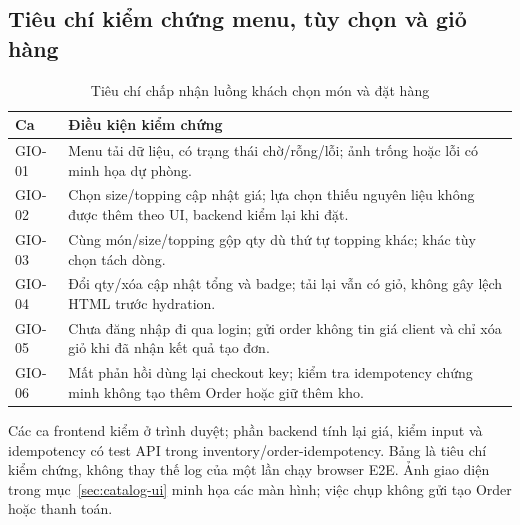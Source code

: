 \subsection{Tiêu chí kiểm chứng menu, tùy chọn và giỏ hàng}
\begin{table}[htbp]\centering\small
\begin{tabularx}{\linewidth}{|p{.13\linewidth}|X|}\hline
\textbf{Ca} & \textbf{Điều kiện kiểm chứng}\\\hline
GIO-01 & Menu tải dữ liệu, có trạng thái chờ/rỗng/lỗi; ảnh trống hoặc lỗi có minh họa dự phòng.\\\hline
GIO-02 & Chọn size/topping cập nhật giá; lựa chọn thiếu nguyên liệu không được thêm theo UI, backend kiểm lại khi đặt.\\\hline
GIO-03 & Cùng món/size/topping gộp qty dù thứ tự topping khác; khác tùy chọn tách dòng.\\\hline
GIO-04 & Đổi qty/xóa cập nhật tổng và badge; tải lại vẫn có giỏ, không gây lệch HTML trước hydration.\\\hline
GIO-05 & Chưa đăng nhập đi qua login; gửi order không tin giá client và chỉ xóa giỏ khi đã nhận kết quả tạo đơn.\\\hline
GIO-06 & Mất phản hồi dùng lại checkout key; kiểm tra idempotency chứng minh không tạo thêm Order hoặc giữ thêm kho.\\\hline
\end{tabularx}\caption{Tiêu chí chấp nhận luồng khách chọn món và đặt hàng}
\end{table}

Các ca frontend kiểm ở trình duyệt; phần backend tính lại giá, kiểm input và idempotency có test API trong inventory/order-idempotency. Bảng là tiêu chí kiểm chứng, không thay thế log của một lần chạy browser E2E. Ảnh giao diện trong mục~\ref{sec:catalog-ui} minh họa các màn hình; việc chụp không gửi tạo Order hoặc thanh toán.
